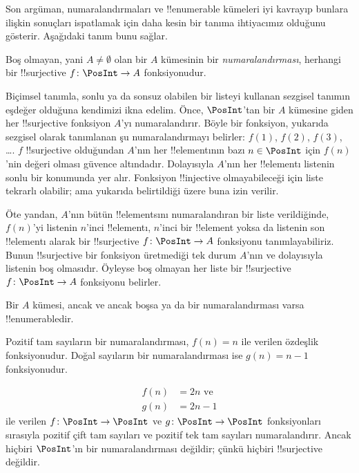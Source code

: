\documentclass[../../../include/open-logic-section]{subfiles}
\begin{document}
Son argüman, numaralandırmaları ve !!{enumerable} kümeleri iyi kavrayıp
bunlara ilişkin sonuçları ispatlamak için daha kesin bir tanıma ihtiyacımız
olduğunu gösterir. Aşağıdaki tanım bunu sağlar.

\begin{defn}
Boş olmayan, yani $A\neq\emptyset$ olan bir $A$ kümesinin bir
\emph{numaralandırması}, herhangi bir
!!{surjective} $f \colon \PosInt \to A$ fonksiyonudur.
\end{defn}

\begin{explain}
Biçimsel tanımla, sonlu ya da sonsuz olabilen bir listeyi kullanan sezgisel
tanımın eşdeğer olduğuna kendimizi ikna edelim. Önce, $\PosInt$'tan bir $A$
kümesine giden her !!{surjective} fonksiyon $A$'yı numaralandırır. Böyle bir
fonksiyon, yukarıda sezgisel olarak tanımlanan şu numaralandırmayı belirler:
$f(1)$, $f(2)$, $f(3)$, \dots. $f$ !!{surjective} olduğundan $A$'nın her
!!{element}{}ının bazı $n \in \PosInt$ için $f(n)$'nin değeri olması güvence
altındadır. Dolayısıyla $A$'nın her !!{element}{}ı listenin sonlu bir konumunda
yer alır. Fonksiyon !!{injective} olmayabileceği için liste tekrarlı olabilir;
ama yukarıda belirtildiği üzere buna izin verilir.

Öte yandan, $A$'nın bütün !!{element}s{}ını numaralandıran bir liste
verildiğinde, $f(n)$'yi listenin $n$'inci !!{element}{}ı, $n$'inci bir
!!{element} yoksa da listenin son !!{element}{}ı alarak bir !!{surjective}
$f\colon \PosInt \to A$ fonksiyonu tanımlayabiliriz. Bunun !!{surjective} bir
fonksiyon üretmediği tek durum $A$'nın ve dolayısıyla listenin boş olmasıdır.
Öyleyse boş olmayan her liste bir !!{surjective} $f\colon \PosInt \to A$
fonksiyonu belirler.
\end{explain}

\begin{defn}
  Bir $A$ kümesi, ancak ve ancak boşsa ya da bir numaralandırması varsa
  !!{enumerable}{}dir.
\end{defn}

\begin{ex}
Pozitif tam sayıların bir numaralandırması, $f(n)=n$ ile verilen özdeşlik
fonksiyonudur. Doğal sayıların bir numaralandırması ise $g(n)=n-1$
fonksiyonudur.
\end{ex}

\begin{ex}
\begin{align*}
f(n) & = 2n \text{ ve}\\
g(n) & = 2n - 1
\end{align*}
ile verilen $f\colon \PosInt \to \PosInt$ ve $g \colon \PosInt \to
\PosInt$ fonksiyonları sırasıyla pozitif çift tam sayıları ve pozitif tek tam
sayıları numaralandırır. Ancak hiçbiri $\PosInt$'ın bir numaralandırması
değildir; çünkü hiçbiri !!{surjective} değildir.
\end{ex}
\end{document}
